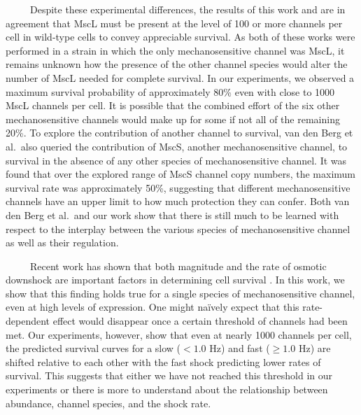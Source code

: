 \documentclass[12pt]{caltech_thesis}
\begin{document}
~~~~~Despite these experimental differences, the results of this work
and \textcite{vandenberg2016} are in agreement that MscL must be present
at the level of 100 or more channels per cell in wild-type cells to
convey appreciable survival. As both of these works were performed in a
strain in which the only mechanosensitive channel was MscL, it remains
unknown how the presence of the other channel species would alter the
number of MscL needed for complete survival. In our experiments, we
observed a maximum survival probability of approximately 80\% even with
close to 1000 MscL channels per cell. It is possible that the combined
effort of the six other mechanosensitive channels would make up for some
if not all of the remaining 20\%. To explore the contribution of another
channel to survival, van den Berg et al.~also queried the contribution
of MscS, another mechanosensitive channel, to survival in the absence of
any other species of mechanosensitive channel. It was found that over
the explored range of MscS channel copy numbers, the maximum survival
rate was approximately 50\%, suggesting that different mechanosensitive
channels have an upper limit to how much protection they can confer.
Both van den Berg et al.~and our work show that there is still much to
be learned with respect to the interplay between the various species of
mechanosensitive channel as well as their regulation.

~~~~~Recent work has shown that both magnitude and the rate of osmotic
downshock are important factors in determining cell survival
\autocite{bialecka-fornal2015}. In this work, we show that this finding
holds true for a single species of mechanosensitive channel, even at
high levels of expression. One might naïvely expect that this
rate-dependent effect would disappear once a certain threshold of
channels had been met. Our experiments, however, show that even at
nearly 1000 channels per cell, the predicted survival curves for a slow
(\(< 1.0\) Hz) and fast (\(\geq 1.0\) Hz) are shifted relative to each
other with the fast shock predicting lower rates of survival. This
suggests that either we have not reached this threshold in our
experiments or there is more to understand about the relationship
between abundance, channel species, and the shock rate.
\end{document}
